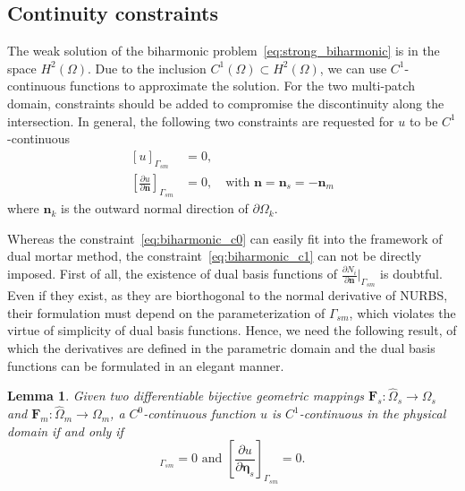 \documentclass[preprint,12pt]{elsarticle}
\newtheorem{lemma}{Lemma}
\begin{document}
\subsection{Continuity constraints}
The weak solution of the biharmonic problem~\eqref{eq:strong_biharmonic} is in the space $H^2(\Omega)$. Due to the inclusion $C^1(\Omega)\subset{}H^2(\Omega)$, we can use $C^1$-continuous functions to approximate the solution. For the two multi-patch domain, constraints should be added to compromise the discontinuity along the intersection. In general, the following two constraints are requested for $u$ to be $C^1$-continuous
\begin{subequations}
    \begin{align}
        [u]_{\Gamma_{sm}}&=0,\label{eq:biharmonic_c0}\\
        [\frac{\partial{u}}{\partial{\mathbf{n}}}]_{\Gamma_{sm}}&=0,\quad\text{with }\mathbf{n}=\mathbf{n}_s=-\mathbf{n}_m\label{eq:biharmonic_c1}
    \end{align}
\end{subequations}
where $\mathbf{n}_k$ is the outward normal direction of $\partial{\Omega_k}$.\par
Whereas the constraint~\eqref{eq:biharmonic_c0} can easily fit into the framework of dual mortar method, the constraint~\eqref{eq:biharmonic_c1} can not be directly imposed. First of all, the existence of dual basis functions of $\frac{\partial{N_i}}{\partial{\mathbf{n}}}\vert_{\Gamma_{sm}}$ is doubtful. Even if they exist, as they are biorthogonal to the normal derivative of NURBS, their formulation must depend on the parameterization of $\Gamma_{sm}$, which violates the virtue of simplicity of dual basis functions. Hence, we need the following result, of which the derivatives are defined in the parametric domain and the dual basis functions can be formulated in an elegant manner.\par
\begin{lemma}
    Given two differentiable bijective geometric mappings $\mathbf{F}_{s}\colon\hat{\Omega}_s\rightarrow{\Omega}_s$ and $\mathbf{F}_{m}\colon\hat{\Omega}_m\rightarrow{\Omega}_m$, a $C^0$-continuous function $u$ is $C^1$-continuous in the physical domain if and only if
    \begin{equation}
        [\frac{\partial{u}}{\partial{\mathbf{\xi}_s}}]_{\Gamma_{sm}}=0\text{ and }[\frac{\partial{u}}{\partial{\mathbf{\eta}_s}}]_{\Gamma_{sm}}=0. \label{eq:biharmonic_c1}
    \end{equation} 
\end{lemma}
     
\end{document}
